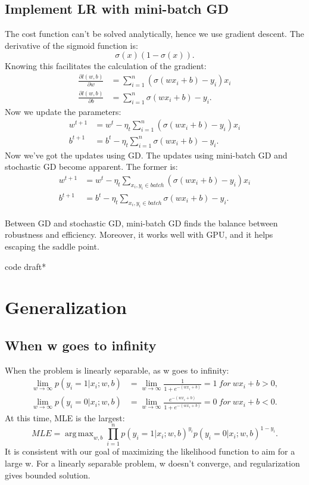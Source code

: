 \documentclass{report}
\DeclareMathOperator*{\argmax}{arg\,max}
\begin{document}
  \section{Implement LR with mini-batch GD}The cost function can't be solved analytically, hence we use gradient descent.
  The derivative of the sigmoid function is:
  \[
  \sigma(x)(1 - \sigma(x))
  .\] 
  Knowing this facilitates the calculation of the gradient: 
  \begin{align*}
	  \frac{\partial l(w, b)}{\partial w} & = \sum_{i = 1}^{n} (\sigma(wx_i + b) - y_i) x_i \\
\frac{\partial l(w, b)}{\partial b} & = \sum_{i = 1}^{n} \sigma(wx_i + b) - y_i. 
  \end{align*}
  Now we update the parameters:
  \begin{align*}
    w^{t+1} &= w^t - \eta_t \sum_{i=1}^{n} (\sigma(wx_i + b) - y_i) x_i \\
    b^{t+1} &= b^t - \eta_t \sum_{i=1}^{n} \sigma(wx_i + b) - y_i
  .\end{align*}
Now we've got the updates using GD. The updates using mini-batch GD and stochastic GD become apparent. The former is:
  \begin{align*}
    w^{t+1} &= w^t - \eta_t \sum_{x_i, y_i \in batch}(\sigma(wx_i + b) - y_i) x_i \\
    b^{t+1} &= b^t - \eta_t \sum_{x_i, y_i \in batch}\sigma(wx_i + b) - y_i
  .\end{align*}

  Between GD and stochastic GD, mini-batch GD finds the balance between robustness and efficiency. Moreover, it works well with GPU, and it helps escaping the saddle point. 

  code draft*
  \chapter{Generalization}
  \section{When w goes to infinity}
  When the problem is linearly separable, as w goes to infinity:
 \begin{align*}
	\lim_{w \to \infty} p\left( y_{i}=1 | x_{i} ; w,b \right) &=  \lim_{w \to \infty} \frac{1}{1 + e^{-(wx_{i} + b)} } = 1 \ for\ wx_i + b > 0,\\
	\lim_{w \to \infty} p( y_{i}=0 | x_{i} ; w,b ) &= \lim_{w \to \infty} \frac{e^{-(wx_{i}+b)}}{1 + e^{-(wx_{i} + b)}} = 0\ for\ wx_i + b < 0 
.\end{align*}
At this time, MLE is the largest:
 \[
	 MLE = \argmax_{w, b} \prod_{i=1}^{n}  p\left( y_{i}=1 | x_{i} ; w,b \right)^{y_{i}}p\left( y_{i}=0 | x_{i} ; w,b \right)^{1 - y_{i}}  
.\] 
It is consistent with our goal of maximizing the likelihood function to aim for a large w. For a linearly separable problem, w doesn't converge, and regularization gives bounded solution.
\end{document}
